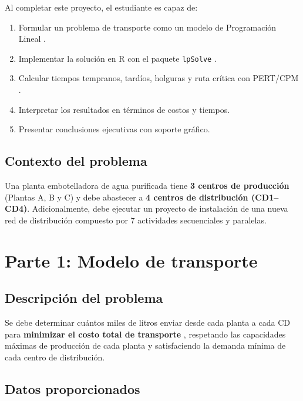 \documentclass[12pt,a4paper]{article}
\begin{document}
Al completar este proyecto, el estudiante es capaz de:

\begin{enumerate}
  \item Formular un problema de transporte como un modelo de Programaci\'{o}n Lineal \cite{taha2012}.
  \item Implementar la soluci\'{o}n en R con el paquete \texttt{lpSolve} \cite{rprogramming2024}.
  \item Calcular tiempos tempranos, tard\'{i}os, holguras y ruta cr\'{i}tica con PERT/CPM \cite{render2012}.
  \item Interpretar los resultados en t\'{e}rminos de costos y tiempos.
  \item Presentar conclusiones ejecutivas con soporte gr\'{a}fico.
\end{enumerate}

\subsection{Contexto del problema}

Una planta embotelladora de agua purificada tiene \textbf{3 centros de producci\'{o}n}
(Plantas A, B y C) y debe abastecer a \textbf{4 centros de distribuci\'{o}n (CD1--CD4)}.
Adicionalmente, debe ejecutar un proyecto de instalaci\'{o}n de una nueva red de
distribuci\'{o}n compuesto por 7 actividades secuenciales y paralelas.

\newpage

\section{Parte 1: Modelo de transporte}

\subsection{Descripci\'{o}n del problema}

Se debe determinar cu\'{a}ntos miles de litros enviar desde cada planta a cada CD para
\textbf{minimizar el costo total de transporte} \cite{taha2012}, respetando las capacidades 
m\'{a}ximas de producci\'{o}n de cada planta y satisfaciendo la demanda m\'{i}nima de cada 
centro de distribuci\'{o}n.

\subsection{Datos proporcionados}
\end{document}
